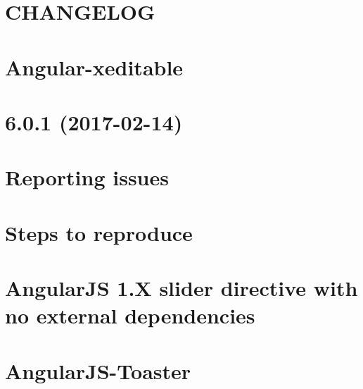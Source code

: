 \documentclass[twoside]{book}
\newcommand{\+}{\discretionary{\mbox{\scriptsize$\hookleftarrow$}}{}{}}
\begin{document}
\chapter{C\+H\+A\+N\+G\+E\+L\+OG}
\label{md_app_web_bower_components_angular-ui-utils__c_h_a_n_g_e_l_o_g}

\chapter{Angular-\/xeditable}
\label{md_app_web_bower_components_angular-xeditable_readme}

\chapter{6.0.1 (2017-\/02-\/14)}
\label{md_app_web_bower_components_angularjs-slider__c_h_a_n_g_e_l_o_g}

\chapter{Reporting issues}
\label{md_app_web_bower_components_angularjs-slider__c_o_n_t_r_i_b_u_t_i_n_g}

\chapter{Steps to reproduce}
\label{md_app_web_bower_components_angularjs-slider_issue_template}

\chapter{Angular\+JS 1.X slider directive with no external dependencies}
\label{md_app_web_bower_components_angularjs-slider__r_e_a_d_m_e}

\chapter{Angular\+J\+S-\/\+Toaster}
\label{md_app_web_bower_components__angular_j_s-_toaster__r_e_a_d_m_e}

\end{document}
